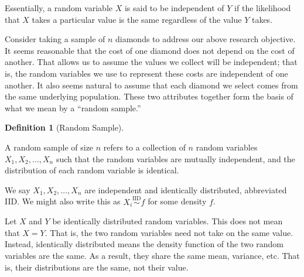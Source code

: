 \documentclass[
  letterpaper,
  DIV=11,
  numbers=noendperiod]{scrreprt}
\theoremstyle{definition}
\newtheorem{definition}{Definition}[chapter]
\theoremstyle{plain}
\theoremstyle{definition}
\theoremstyle{remark}
\begin{document}
Essentially, a random variable \(X\) is said to be independent of \(Y\)
if the likelihood that \(X\) takes a particular value is the same
regardless of the value \(Y\) takes.

Consider taking a sample of \(n\) diamonds to address our above research
objective. It seems reasonable that the cost of one diamond does not
depend on the cost of another. That allows us to assume the values we
collect will be independent; that is, the random variables we use to
represent these costs are independent of one another. It also seems
natural to assume that each diamond we select comes from the same
underlying population. These two attributes together form the basis of
what we mean by a ``random sample.''

\begin{definition}[Random
Sample]\protect\hypertarget{def-random-sample}{}\label{def-random-sample}

A random sample of size \(n\) refers to a collection of \(n\) random
variables \(X_1, X_2, \dotsc, X_n\) such that the random variables are
mutually independent, and the distribution of each random variable is
identical.

We say \(X_1, X_2, \dotsc, X_n\) are independent and identically
distributed, abbreviated IID. We might also write this as
\(X_i \stackrel{\text{IID}}{\sim} f\) for some density \(f\).

\end{definition}

\begin{tcolorbox}[enhanced jigsaw, rightrule=.15mm, leftrule=.75mm, opacityback=0, coltitle=black, bottomrule=.15mm, opacitybacktitle=0.6, left=2mm, colframe=quarto-callout-warning-color-frame, breakable, colback=white, arc=.35mm, toprule=.15mm, toptitle=1mm, bottomtitle=1mm, title=\textcolor{quarto-callout-warning-color}{\faExclamationTriangle}\hspace{0.5em}{Warning}, titlerule=0mm, colbacktitle=quarto-callout-warning-color!10!white]

Let \(X\) and \(Y\) be identically distributed random variables. This
does not mean that \(X = Y\). That is, the two random variables need not
take on the same value. Instead, identically distributed means the
density function of the two random variables are the same. As a result,
they share the same mean, variance, etc. That is, their distributions
are the same, not their value.

\end{tcolorbox}
\end{document}
